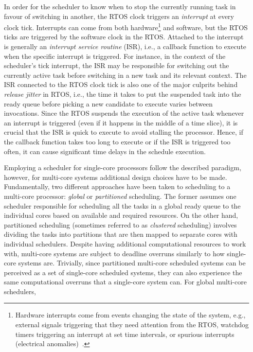 In order for the scheduler to know when to stop the currently running task in favour of switching in another, the RTOS clock triggers an \emph{interrupt} at every clock tick.
Interrupts can come from both hardware\footnote{Hardware interrupts come from events changing the state of the system, e.g., external signals triggering that they need attention from the RTOS, watchdog timers triggering an interrupt at set time intervals, or spurious interrupts (electrical anomalies)~\addref{}.} and software, but the RTOS ticks are triggered by the software clock in the RTOS.
Attached to the interrupt is generally an \emph{interrupt service routine} (ISR), i.e., a callback function to execute when the specific interrupt is triggered.
For instance, in the context of the scheduler's tick interrupt, the ISR may be responsible for switching out the currently active task before switching in a new task and its relevant context.
The ISR connected to the RTOS clock tick is also one of the major culprits behind \emph{release jitter} in RTOS, i.e., the time it takes to put the suspended task into the ready queue before picking a new candidate to execute varies between invocations.
Since the RTOS suspends the execution of the active task whenever an interrupt is triggered (even if it happens in the middle of a time slice), it is crucial that the ISR is quick to execute to avoid stalling the processor.
Hence, if the callback function takes too long to execute or if the ISR is triggered too often, it can cause significant time delays in the schedule execution.

Employing a scheduler for single-core processors follow the described paradigm, however, for multi-core systems additional design choices have to be made.
Fundamentally, two different approaches have been taken to scheduling to a multi-core processor: \emph{global} or \emph{partitioned} scheduling.
The former assumes one scheduler responsible for scheduling all the tasks in a global ready queue to the individual cores based on available and required resources.
On the other hand, partitioned scheduling (sometimes referred to as \emph{clustered} scheduling) involves dividing the tasks into partitions that are then mapped to separate cores with individual schedulers.
Despite having additional computational resources to work with, multi-core systems are subject to deadline overruns similarly to how single-core systems are.
Trivially, since partitioned multi-core scheduled systems can be perceived as a set of single-core scheduled systems, they can also experience the same computational overruns that a single-core system can.
For global multi-core schedulers, 


